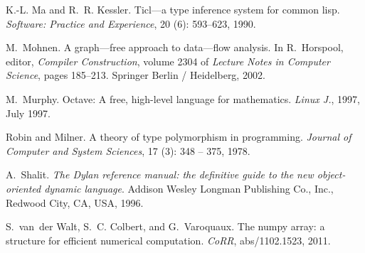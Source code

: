 \documentclass[9pt]{sigplanconf}
\begin{document}
\begin{thebibliography}{27}
K.-L. Ma and R.~R. Kessler.
\newblock Ticl—a type inference system for common lisp.
\newblock \emph{Software: Practice and Experience}, 20 (6):
  593--623, 1990.

M.~Mohnen.
\newblock A graph—free approach to data—flow analysis.
\newblock In R.~Horspool, editor, \emph{Compiler Construction}, volume 2304 of
  \emph{Lecture Notes in Computer Science}, pages 185--213. Springer Berlin /
  Heidelberg, 2002.

M.~Murphy.
\newblock Octave: A free, high-level language for mathematics.
\newblock \emph{Linux J.}, 1997, July 1997.

Robin and Milner.
\newblock A theory of type polymorphism in programming.
\newblock \emph{Journal of Computer and System Sciences}, 17
  (3): 348 -- 375, 1978.

A.~Shalit.
\newblock \emph{The Dylan reference manual: the definitive guide to the new
  object-oriented dynamic language}.
\newblock Addison Wesley Longman Publishing Co., Inc., Redwood City, CA, USA,
  1996.

S.~van~der Walt, S.~C. Colbert, and G.~Varoquaux.
\newblock The numpy array: a structure for efficient numerical computation.
\newblock \emph{CoRR}, abs/1102.1523, 2011.

\end{thebibliography}
\end{document}

